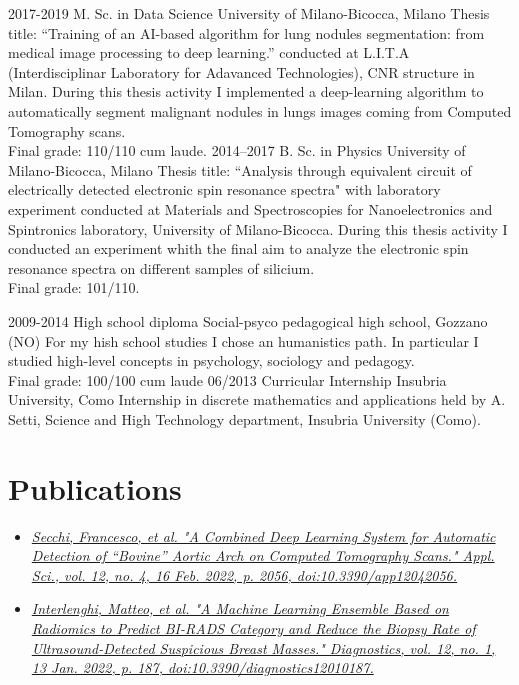 \documentclass[a4paper]{friggeri-cv}
\begin{document}
\begin{entrylist}
  \entry
    {2017-2019}
    {M. Sc. in Data Science}
    {University of Milano-Bicocca, Milano}
    {Thesis title: ``Training of an AI-based algorithm for lung nodules segmentation: from medical image processing to deep learning.'' conducted at L.I.T.A (Interdisciplinar Laboratory for Adavanced Technologies), CNR structure in Milan. During this thesis activity I implemented a deep-learning algorithm to automatically segment malignant nodules in lungs images coming from Computed Tomography scans.\\
    Final grade: 110/110 cum laude.}
  \entry
    {2014–2017}
    {B. Sc. in Physics}
    {University of Milano-Bicocca, Milano}
    {Thesis title: ``Analysis through equivalent circuit of electrically detected electronic spin resonance spectra" with laboratory experiment conducted at Materials and Spectroscopies for Nanoelectronics and Spintronics laboratory, University of Milano-Bicocca. During this thesis activity I conducted an experiment whith the final aim to analyze the electronic spin resonance spectra on different samples of silicium.\\
    Final grade: 101/110. }
\end{entrylist}
\clearpage
\begin{entrylist}
  \entry
    {2009-2014}
    {High school diploma}
    {Social-psyco pedagogical high school, Gozzano (NO)}
    {For my hish school studies I chose an humanistics path. In particular I studied high-level concepts in psychology, sociology and pedagogy.\\
    Final grade: 100/100 cum laude}
  \entry
    {06/2013}
    {Curricular Internship}
    {Insubria University, Como}
    {Internship in discrete mathematics and applications held by A. Setti, Science and High Technology department, Insubria University (Como).}
\end{entrylist}

\section{Publications}
\begin{itemize}
	\item \href{https://www.mdpi.com/2076-3417/12/4/2056/htm}{\textit{Secchi, Francesco, et al. "A Combined Deep Learning System for Automatic Detection of “Bovine” Aortic Arch on Computed Tomography Scans." Appl. Sci., vol. 12, no. 4, 16 Feb. 2022, p. 2056, doi:10.3390/app12042056.}}
	\item \href{https://www.mdpi.com/2075-4418/12/1/187/htm}{\textit{Interlenghi, Matteo, et al. "A Machine Learning Ensemble Based on Radiomics to Predict BI-RADS Category and Reduce the Biopsy Rate of Ultrasound-Detected Suspicious Breast Masses." Diagnostics, vol. 12, no. 1, 13 Jan. 2022, p. 187, doi:10.3390/diagnostics12010187.}}
\end{itemize}
\end{document}
